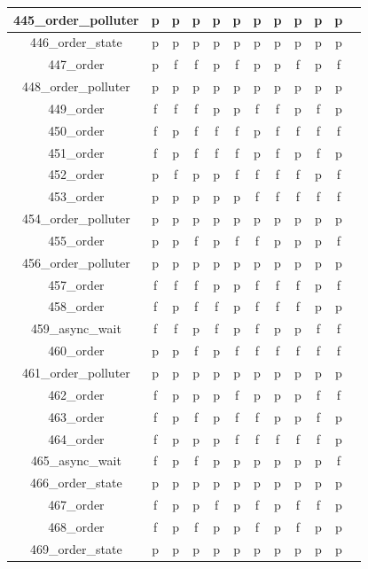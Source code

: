 \documentclass[
fancyheadings, %
%
%
]{stsreprt}
\begin{document}
\begin{longtable}{|c|c|c|c|c|c|c|c|c|c|c|c|}
\hline
445\_order\_polluter & p & p & p & p & p & p & p & p & p & p \\
\hline
446\_order\_state & p & p & p & p & p & p & p & p & p & p \\
\hline
447\_order & p & f & f & p & f & p & p & f & p & f \\
\hline
448\_order\_polluter & p & p & p & p & p & p & p & p & p & p \\
\hline
449\_order & f & f & f & p & p & f & f & p & f & p \\
\hline
450\_order & f & p & f & f & f & p & f & f & f & f \\
\hline
451\_order & f & p & f & f & f & p & f & p & f & p \\
\hline
452\_order & p & f & p & p & f & f & f & f & p & f \\
\hline
453\_order & p & p & p & p & p & f & f & f & f & f \\
\hline
454\_order\_polluter & p & p & p & p & p & p & p & p & p & p \\
\hline
455\_order & p & p & f & p & f & f & p & p & p & f \\
\hline
456\_order\_polluter & p & p & p & p & p & p & p & p & p & p \\
\hline
457\_order & f & f & f & p & p & f & f & f & p & f \\
\hline
458\_order & f & p & f & f & p & f & f & f & p & p \\
\hline
459\_async\_wait & f & f & p & f & p & f & p & p & f & f \\
\hline
460\_order & p & p & f & p & f & f & f & f & f & f \\
\hline
461\_order\_polluter & p & p & p & p & p & p & p & p & p & p \\
\hline
462\_order & f & p & p & p & f & p & p & p & f & f \\
\hline
463\_order & f & p & f & p & f & f & p & p & f & p \\
\hline
464\_order & f & p & p & p & f & f & f & f & f & p \\
\hline
465\_async\_wait & f & p & f & p & p & p & p & p & p & f \\
\hline
466\_order\_state & p & p & p & p & p & p & p & p & p & p \\
\hline
467\_order & f & p & p & f & p & f & p & f & f & p \\
\hline
468\_order & f & p & f & p & p & f & p & f & p & p \\
\hline
469\_order\_state & p & p & p & p & p & p & p & p & p & p \\

\end{longtable}
\end{document}
